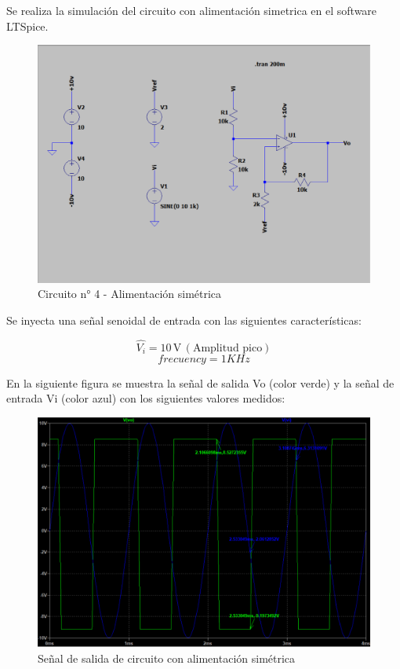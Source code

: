 Se realiza la simulación del circuito con alimentación simetrica en el software LTSpice.
\begin{figure}[h!]
    \centering
    \includegraphics[width=1.0\linewidth]{Secciones/Circuito4/Circuito 4 - Alimentación simétrica.png}
    \caption{Circuito n° 4 - Alimentación simétrica}
    \label{fig:AlimentacionSimetrica}
\end{figure}

Se inyecta una señal senoidal de entrada con las siguientes características:

\[ \widehat{V_i} = 10 \, \text{V} \, (\text{Amplitud pico}) \]
\[frecuency= 1KHz\]

En la siguiente figura se muestra la señal de salida Vo (color verde)  y la señal de entrada Vi (color azul) con los siguientes valores medidos:
\begin{figure}[H]
    \centering
    \includegraphics[width=1.0\linewidth]{Secciones/Circuito4/Circuito 4 - Simulación con alimentación simétrica.png}
    \caption{Señal de salida de circuito con alimentación simétrica}
    \label{fig:SimulacionConAlimentacionSimetrica}
\end{figure}

